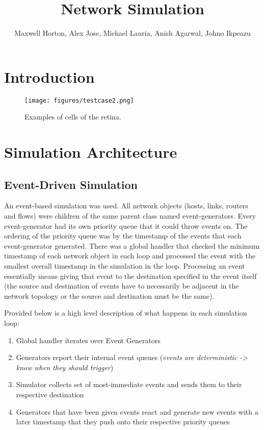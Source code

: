 \documentclass[12pt]{article}
\begin{document}
\title{Network Simulation}
\author{Maxwell Horton, Alex Jose, Michael Lauria, Anish Agarwal, Johno Ikpeazu}


\maketitle
\noindent
\tableofcontents
\newpage
\section{Introduction}

\begin{figure}[t]
\centering \texttt{[image: figures/testcase2.png]}
\caption{Examples of cells of the retina.}
\label{fig:test}
\end{figure}

\section{Simulation Architecture}


\subsection{Event-Driven Simulation}
An event-based simulation was used. All network objects (hosts, links, routers and flows) were children of the same parent class named event-generators. Every event-generator had its own priority queue that it could throw events on. The ordering of the priority queue was by the timestamp of the events that each event-generator generated. There was a global handler that checked the minimum timestamp of each network object in each loop and processed the event with the smallest overall timestamp in the simulation in the loop. Processing an event essentially means giving that event to the destination specified in the event itself (the source and destination of events have to necessarily be adjacent in the network topology or the source and destination must be the same). 

Provided below is a high level description of what happens in each simulation loop:
\begin{enumerate}
\item Global handler iterates over Event Generators
\item Generators report their internal event queues (\emph{events are deterministic -> know when they should trigger})
\item Simulator collects set of most-immediate events and sends them to their respective destination
\item Generators that have been given events react and generate new events with a later timestamp that they push onto their respective priority queues
\end{enumerate}
\end{document}
